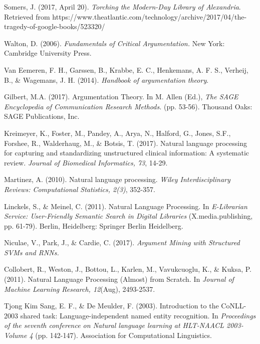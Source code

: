 \documentclass[12pt,a4paper]{article}
\begin{document}
\newpage
\begin{thebibliography}{9}

  Somers, J. (2017, April 20). \textit{Torching the Modern-Day Library of Alexandria}. Retrieved from https://www.theatlantic.com/technology/archive/2017/04/the-tragedy-of-google-books/523320/

  Walton, D. (2006).
  \textit{Fundamentals of Critical Argumentation.}
  New York: Cambridge University Press.
  
  Van Eemeren, F. H., Garssen, B., Krabbe, E. C., Henkemans, A. F. S., Verheij, B., \& Wagemans, J. H. (2014). \textit{Handbook of argumentation theory}.

  Gilbert, M.A. (2017).
  Argumentation Theory. In M. Allen (Ed.), \textit{The SAGE Encyclopedia of Communication Research Methods.} (pp. 53-56). Thousand Oaks: SAGE Publications, Inc.

  Kreimeyer, K., Foster, M., Pandey, A., Arya, N., Halford, G., Jones, S.F., Forshee, R., Walderhaug, M., \& Botsis, T. (2017).
  Natural language processing for capturing and standardizing unstructured clinical information: A systematic review. \textit{Journal of Biomedical Informatics, 73}, 14-29.
  
  Martinez, A. (2010).
  Natural language processing. \textit{Wiley Interdisciplinary Reviews: Computational Statistics, 2(3)}, 352-357.

  Linckels, S., \& Meinel, C. (2011).
  Natural Language Processing. In \textit{E-Librarian Service: User-Friendly Semantic Search in Digital Libraries} (X.media.publishing, pp. 61-79). Berlin, Heidelberg: Springer Berlin Heidelberg.
  
  Niculae, V., Park, J., \& Cardie, C. (2017). \textit{Argument Mining with Structured SVMs and RNNs.}
  
  Collobert, R., Weston, J., Bottou, L., Karlen, M., Vavukcuoglu, K., \& Kuksa, P. (2011).
  Natural Language Processing (Almost) from Scratch. In \textit{Journal of Machine Learning Research, 12}(Aug), 2493-2537.

  Tjong Kim Sang, E. F., \& De Meulder, F. (2003). Introduction to the CoNLL-2003 shared task: Language-independent named entity recognition. In \textit{Proceedings of the seventh conference on Natural language learning at HLT-NAACL 2003-Volume 4} (pp. 142-147). Association for Computational Linguistics.
  

\end{thebibliography}
\end{document}
